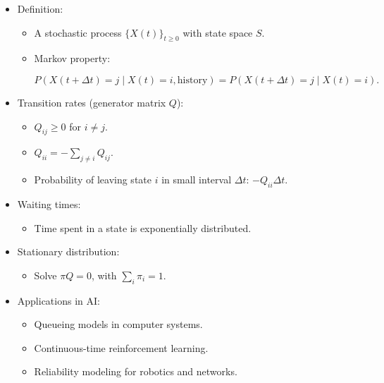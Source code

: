 \documentclass[
  letterpaper,
  DIV=11,
  numbers=noendperiod]{scrreprt}
\providecommand{\tightlist}{%
  \setlength{\itemsep}{0pt}\setlength{\parskip}{0pt}}
\begin{document}
\begin{itemize}
\item
  Definition:

  \begin{itemize}
  \item
    A stochastic process \(\{X(t)\}_{t \geq 0}\) with state space \(S\).
  \item
    Markov property:

    \[
    P(X(t+\Delta t)=j \mid X(t)=i, \text{history}) = P(X(t+\Delta t)=j \mid X(t)=i).
    \]
  \end{itemize}
\item
  Transition rates (generator matrix \(Q\)):

  \begin{itemize}
  \tightlist
  \item
    \(Q_{ij} \geq 0\) for \(i \neq j\).
  \item
    \(Q_{ii} = -\sum_{j \neq i} Q_{ij}\).
  \item
    Probability of leaving state \(i\) in small interval \(\Delta t\):
    \(-Q_{ii}\Delta t\).
  \end{itemize}
\item
  Waiting times:

  \begin{itemize}
  \tightlist
  \item
    Time spent in a state is exponentially distributed.
  \end{itemize}
\item
  Stationary distribution:

  \begin{itemize}
  \tightlist
  \item
    Solve \(\pi Q = 0\), with \(\sum_i \pi_i = 1\).
  \end{itemize}
\item
  Applications in AI:

  \begin{itemize}
  \tightlist
  \item
    Queueing models in computer systems.
  \item
    Continuous-time reinforcement learning.
  \item
    Reliability modeling for robotics and networks.
  \end{itemize}
\end{itemize}
\end{document}
